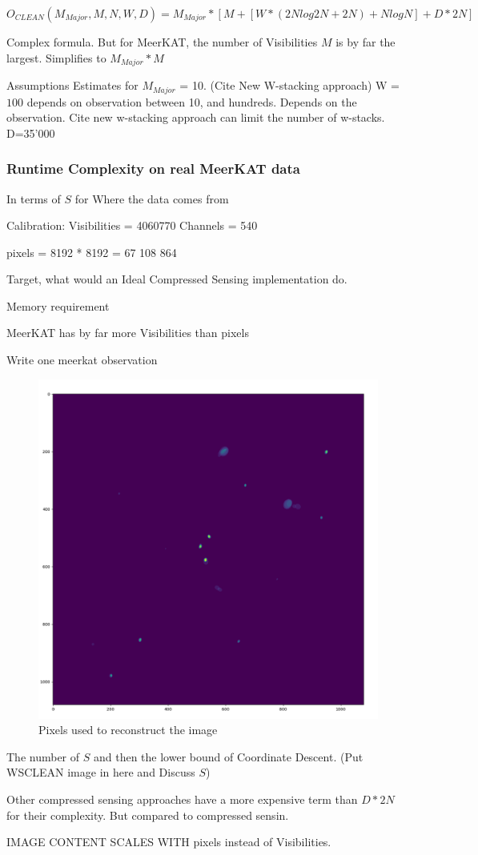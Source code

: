 \begin{equation}
O_{CLEAN}(M_{Major}, M, N,  W, D) = M_{Major} * [M + [W*(2N log 2N + 2N) + N log N] + D*2N]
\end{equation}

Complex formula. But for MeerKAT, the number of Visibilities $M$ is by far the largest. Simplifies to $M_{Major}*M$

Assumptions
Estimates for $M_{Major}$ = 10. (Cite New W-stacking approach)
W = $100$ depends on observation between 10, and hundreds. Depends on the observation. Cite new w-stacking approach can limit the number of w-stacks. 
D=35'000

\subsubsection{Runtime Complexity on real MeerKAT data}
In terms of $S$ for 
Where the data comes from

Calibration: 
Visibilities = 4060770
Channels = 540

pixels = 8192 * 8192 = 67 108 864

Target, what would an Ideal Compressed Sensing implementation do.

Memory requirement

MeerKAT has by far more Visibilities than pixels

Write one meerkat observation

\begin{figure}[h]
	\centering
	\includegraphics[width=0.5\linewidth]{./chapters/05.algorithms/sim00/full_cache_debug.png}
	\caption{Pixels used to reconstruct the image}
	\label{results:wsclean}
\end{figure}
The number of $S$ and then the lower bound of Coordinate Descent. (Put WSCLEAN image in here and Discuss $S$)



Other compressed sensing approaches have a more expensive term than $D*2N$ for their complexity. But compared to compressed sensin.


IMAGE CONTENT SCALES WITH pixels instead of Visibilities.

